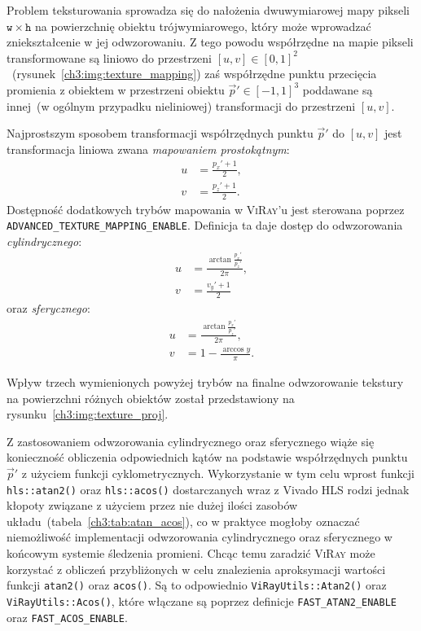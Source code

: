 \begin{enumerate}
Problem teksturowania sprowadza się do nałożenia dwuwymiarowej mapy pikseli $\mathtt{w}\times\mathtt{h}$ na powierzchnię obiektu trójwymiarowego, który może wprowadzać zniekształcenie w jej odwzorowaniu. Z tego powodu współrzędne na mapie pikseli transformowane są liniowo do przestrzeni $[u, v] \in [0, 1]^2$~(rysunek~\ref{ch3:img:texture_mapping}) zaś współrzędne punktu przecięcia promienia z obiektem w przestrzeni obiektu $\vec{p}'\in[-1, 1]^3$ poddawane są innej~(w ogólnym przypadku nieliniowej) transformacji do przestrzeni $[u, v]$. 



Najprostszym sposobem transformacji współrzędnych punktu $\vec{p}'$ do $[u,v]$ jest transformacja liniowa zwana \textit{mapowaniem prostokątnym}:
\begin{align*}
u &= \frac{p_x' + 1}{2},\\
v &= \frac{p_z' + 1}{2}.
\end{align*}
Dostępność dodatkowych trybów mapowania w \textsc{ViRay}'u jest sterowana poprzez \texttt{ADVANCED\_TEXTURE\_MAPPING\_ENABLE}. Definicja ta daje dostęp do odwzorowania \textit{cylindrycznego}:
\begin{align*}
u &= \frac{\arctan\frac{p_x'}{p_z'}}{2\pi},\\
v &= \frac{v_y' + 1}{2}
\end{align*} 
oraz \textit{sferycznego}:
\begin{align*}
u &= \frac{\arctan\frac{p_x'}{p_z'}}{2\pi},\\
v &= 1 - \frac{\arccos y}{\pi}.
\end{align*} 

Wpływ trzech wymienionych powyżej trybów na finalne odwzorowanie tekstury na powierzchni różnych obiektów został przedstawiony na rysunku~\ref{ch3:img:texture_proj}.



Z zastosowaniem odwzorowania cylindrycznego oraz sferycznego wiąże się konieczność obliczenia odpowiednich kątów na podstawie współrzędnych punktu $\vec{p}'$ z użyciem funkcji cyklometrycznych. Wykorzystanie w tym celu wprost funkcji \texttt{hls::atan2()} oraz \texttt{hls::acos()} dostarczanych wraz z Vivado HLS rodzi jednak kłopoty związane z użyciem przez nie dużej ilości zasobów układu~(tabela~\ref{ch3:tab:atan_acos}), co w praktyce mogłoby oznaczać niemożliwość implementacji odwzorowania cylindrycznego oraz sferycznego w końcowym systemie śledzenia promieni. Chcąc temu zaradzić \textsc{ViRay} może korzystać z obliczeń przybliżonych w celu znalezienia aproksymacji wartości funkcji \texttt{atan2()} oraz \texttt{acos()}. Są to odpowiednio \texttt{ViRayUtils::Atan2()} oraz \texttt{ViRayUtils::Acos()}, które włączane są poprzez definicje \texttt{FAST\_ATAN2\_ENABLE} oraz \texttt{FAST\_ACOS\_ENABLE}.


\end{enumerate}
